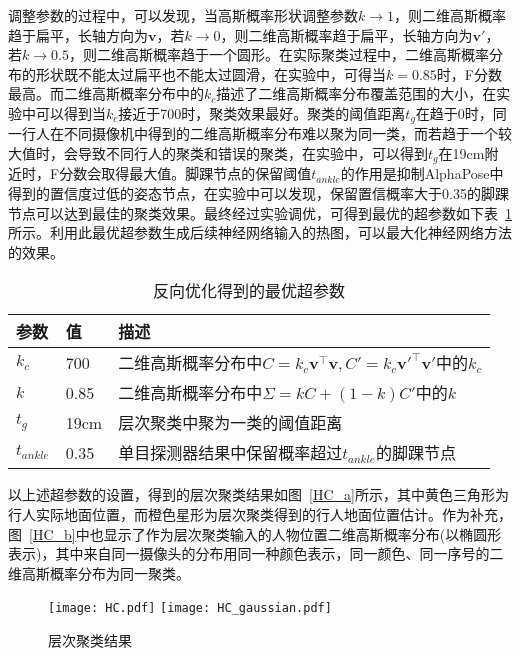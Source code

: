 调整参数的过程中，可以发现，当高斯概率形状调整参数$k\rightarrow1$，则二维高斯概率趋于扁平，长轴方向为$\bm{v}$，若$k\rightarrow0$，则二维高斯概率趋于扁平，长轴方向为$\bm{v}'$，若$k\rightarrow0.5$，则二维高斯概率趋于一个圆形。在实际聚类过程中，二维高斯概率分布的形状既不能太过扁平也不能太过圆滑，在实验中，可得当$k=0.85$时，F分数最高。而二维高斯概率分布中的$k_c$描述了二维高斯概率分布覆盖范围的大小，在实验中可以得到当$k_c$接近于700时，聚类效果最好。聚类的阈值距离$t_g$在趋于0时，同一行人在不同摄像机中得到的二维高斯概率分布难以聚为同一类，而若趋于一个较大值时，会导致不同行人的聚类和错误的聚类，在实验中，可以得到$t_g$在19cm附近时，F分数会取得最大值。脚踝节点的保留阈值$t_{ankle}$的作用是抑制AlphaPose中得到的置信度过低的姿态节点，在实验中可以发现，保留置信概率大于0.35的脚踝节点可以达到最佳的聚类效果。最终经过实验调优，可得到最优的超参数如下表~\ref{parameter_table}所示。利用此最优超参数生成后续神经网络输入的热图，可以最大化神经网络方法的效果。
\begin{table}
    \centering
    \caption{反向优化得到的最优超参数}
    \begin{tabular}{lll}
        \toprule
        参数 & 值  & 描述         \\
        \midrule
        $k_{c}$ & 700 & 二维高斯概率分布中$C=k_{c}\bm{v}^\top\bm{v}, C'=k_{c}\bm{v}'^\top\bm{v}'$中的$k_{c}$ \\
        $k$   & 0.85 &  二维高斯概率分布中$\Sigma=kC + (1-k)C'$中的$k$   \\
        $t_{g}$ & 19cm &  层次聚类中聚为一类的阈值距离  \\
        $t_{ankle}$ & 0.35 &  单目探测器结果中保留概率超过$t_{ankle}$的脚踝节点 \\
        \bottomrule
    \end{tabular}
    \label{parameter_table}
\end{table}

以上述超参数的设置，得到的层次聚类结果如图~\ref{HC_a}所示，其中黄色三角形为行人实际地面位置，而橙色星形为层次聚类得到的行人地面位置估计。作为补充，图~\ref{HC_b}中也显示了作为层次聚类输入的人物位置二维高斯概率分布(以椭圆形表示)，其中来自同一摄像头的分布用同一种颜色表示，同一颜色、同一序号的二维高斯概率分布为同一聚类。
\begin{figure}
    \centering
    \subcaptionbox{\label{HC_a}}
      {\texttt{[image: HC.pdf]}}
    \subcaptionbox{\label{HC_b}}
      {\texttt{[image: HC\_gaussian.pdf]}}
    \caption{层次聚类结果}
    \label{HC}
\end{figure}

